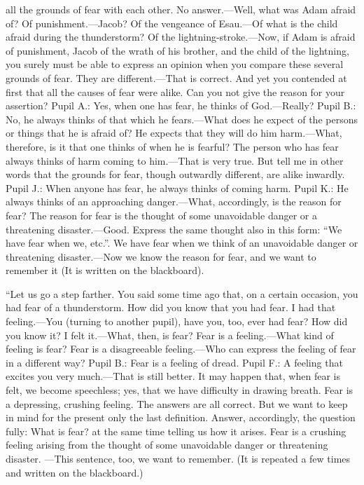 all the grounds of fear with each other. No answer.—Well, what was Adam afraid of? Of punishment.—Jacob? Of the vengeance of Esau.—Of what is the child afraid during the thunderstorm? Of the lightning-stroke.—Now, if Adam is afraid of punishment, Jacob of the wrath of his brother, and the child of the lightning, you surely must be able to express an opinion when you compare these several grounds of fear. They are different.—That is correct. And yet you contended at first that all the causes of fear were alike. Can you not give the reason for your assertion? Pupil A.: Yes, when one has fear, he thinks of God.—Really? Pupil B.: No, he always thinks of that which he fears.—What does he expect of the persons or things that he is afraid of? He expects that they will do him harm.—What, therefore, is it that one thinks of when he is fearful? The person who has fear always thinks of harm coming to him.—That is very true. But tell me in other words that the grounds for fear, though outwardly different, are alike inwardly. Pupil J.: When anyone has fear, he always thinks of coming harm. Pupil K.: He always thinks of an approaching danger.—What, accordingly, is the reason for fear? The reason for fear is the thought of some unavoidable danger or a threatening disaster.—Good. Express the same thought also in this form: “We have fear when we, etc.”. We have fear when we think of an unavoidable danger or threatening disaster.—Now we know the reason for fear, and we want to remember it (It is written on the blackboard).

“Let us go a step farther. You said some time ago that, on a certain occasion, you had fear of a thunderstorm. How did you know that you had fear. I had that feeling.—You (turning to another pupil), have you, too, ever had fear? How did you know it? I felt it.—What, then, is fear? Fear is a feeling.—What kind of feeling is fear? Fear is a disagreeable feeling.—Who can express the feeling of fear in a different way? Pupil B.: Fear is a feeling of dread. Pupil F.: A feeling that excites you very much.—That is still better. It may happen that, when fear is felt, we become speechless; yes, that we have difficulty in drawing breath. Fear is a depressing, crushing feeling. The answers are all correct. But we want to keep in mind for the present only the last definition. Answer, accordingly, the question fully: What is fear? at the same time telling us how it arises. Fear is a crushing feeling arising from the thought of some unavoidable danger or threatening disaster.
—This sentence, too, we want to remember. (It is repeated a few times and written on the blackboard.)

